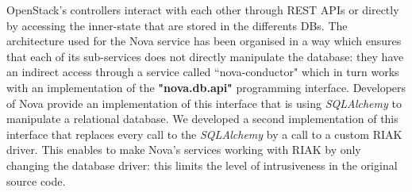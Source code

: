 OpenStack's controllers interact with each other through REST APIs or directly
by accessing the inner-state that are stored in the differents DBs. The
architecture used for the Nova service has been organised in a way which ensures
that each of its sub-services does not directly manipulate the database: they
have an indirect access through a service called ``nova-conductor" which in turn
works with an implementation of the \textbf{"nova.db.api"} programming
interface. Developers of Nova provide an implementation of this interface that
is using \textit{SQLAlchemy} to manipulate a relational database. We developed a
second implementation of this interface that replaces every call to the
\textit{SQLAlchemy} by a call to a custom RIAK driver. This enables to make
Nova's services working with RIAK by only changing the database driver: this
limits the level of intrusiveness in the original source code.
